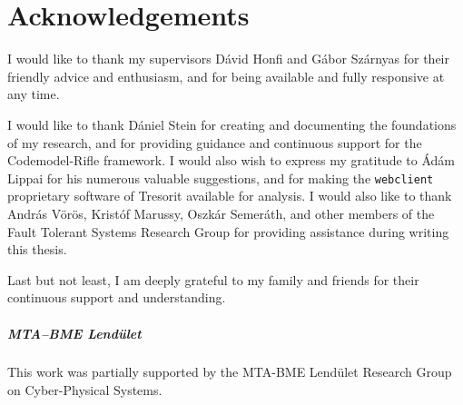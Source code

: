 \chapter*{Acknowledgements}
{}
\thispagestyle{plain}

I would like to thank my supervisors Dávid Honfi and Gábor Szárnyas for their friendly advice and enthusiasm, and for being available and fully responsive at any time.

I would like to thank Dániel Stein for creating and documenting the foundations of my research, and for providing guidance and continuous support for the Codemodel-Rifle framework. I would also wish to express my gratitude to Ádám Lippai for his numerous valuable suggestions, and for making the \lstinline{webclient} proprietary software of Tresorit available for analysis. I would also like to thank András Vörös, Kristóf Marussy, Oszkár Semeráth, and other members of the Fault Tolerant Systems Research Group for providing assistance during writing this thesis.

Last but not least, I am deeply grateful to my family and friends for their continuous support and understanding.

\vfill
\paragraph{MTA–BME Lendület}
This work was partially supported by the MTA-BME Lendület Research Group on Cyber-Physical Systems.

